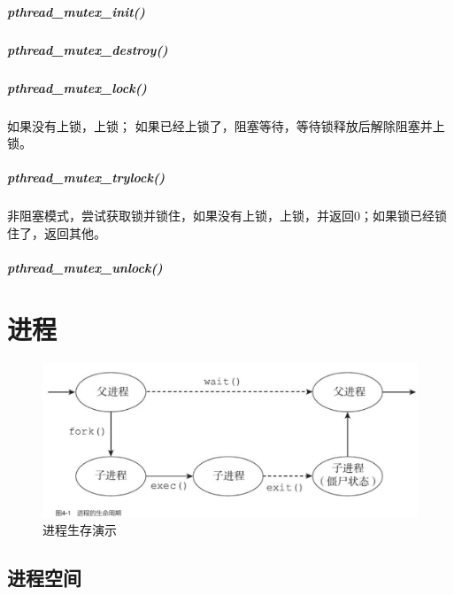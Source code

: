 \documentclass[UTF8,a4paper,12pt]{ctexbook}
\begin{document}
		\paragraph{pthread\_mutex\_init()}
		\paragraph{pthread\_mutex\_destroy()}
		\paragraph{pthread\_mutex\_lock()} 如果没有上锁，上锁； 如果已经上锁了，阻塞等待，等待锁释放后解除阻塞并上锁。
		\paragraph{pthread\_mutex\_trylock()}非阻塞模式，尝试获取锁并锁住，如果没有上锁，上锁，并返回0；如果锁已经锁住了，返回其他。
		\paragraph{pthread\_mutex\_unlock()}
						 
\chapter{进程}
	\begin{figure}[H]
		\centering
		\includegraphics[scale=0.5]{process.png}
		\caption{进程生存演示}
	\end{figure}
	
	\section{进程空间}
	
\end{document}
